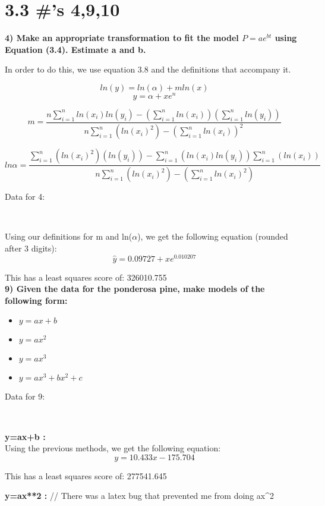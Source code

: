 \documentclass[12pt]{article} %
\begin{document}
\section*{3.3 \#'s 4,9,10}

\textbf{4) Make an appropriate transformation to fit the model $P=ae^{bt}$ using Equation (3.4). Estimate a and b.}

In order to do this, we use equation 3.8 and the definitions that accompany it.

\[ln(y)=ln(\alpha)+m ln(x)\]
\[y=\alpha+xe^n\]

\[m = \frac{n\sum_{i=1}^{n}ln(x_{i})ln(y_{i})-(\sum_{i=1}^{n}ln(x_{i}))(\sum_{i=1}^{n}ln(y_{i}))}{n\sum_{i=1}^{n}(ln(x_{i})^2)-(\sum_{i=1}^{n}ln(x_{i}))^2} \]

\[ln\alpha = \frac{\sum_{i=1}^{n}(ln(x_{i})^2)(ln(y_{i}))-\sum_{i=1}^{n}(ln(x_{i})ln(y_{i}))\sum_{i=1}^{n}(ln(x_{i}))}{n\sum_{i=1}^{n}(ln(x_{i})^2)-(\sum_{i=1}^{n}ln(x_{i})^2)} \]

Data for 4:

{\centering
{}
\\}


Using our definitions for m and ln($\alpha$), we get the following equation (rounded after 3 digits):
\[\hat{y}=0.09727 + xe^{0.010207}\]

This has a least squares score of: 326010.755
\\

\textbf{9) Given the data for the ponderosa pine, make models of the following form:}
\begin{itemize}
  \item
  $y=ax+b$
  \item
  $y=ax^2$
  \item
  $y=ax^3$
  \item
  $y=ax^3+bx^2+c$
\end{itemize}

Data for 9:

{\centering
{}
\\}

\textbf{y=ax+b :}
\\
Using the previous methods, we get the following equation:
\[y = 10.433x-175.704 \]

This has a least squares score of: 277541.645

\textbf{ y=ax**2 :} // There was a latex bug that prevented me from doing ax^2
\\
\end{document}
